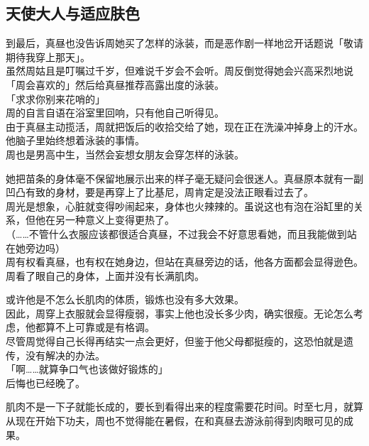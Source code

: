 \subsection{天使大人与适应肤色}

到最后，真昼也没告诉周她买了怎样的泳装，而是恶作剧一样地岔开话题说「敬请期待我穿上那天」。\\

虽然周姑且是叮嘱过千岁，但难说千岁会不会听。周反倒觉得她会兴高采烈地说「周会喜欢的」然后给真昼推荐高露出度的泳装。\\

「求求你别来花哨的」\\

周的自言自语在浴室里回响，只有他自己听得见。\\

由于真昼主动揽活，周就把饭后的收拾交给了她，现在正在洗澡冲掉身上的汗水。他脑子里始终想着泳装的事情。\\

周也是男高中生，当然会妄想女朋友会穿怎样的泳装。

她把苗条的身体毫不保留地展示出来的样子毫无疑问会很迷人。真昼原本就有一副凹凸有致的身材，要是再穿上了比基尼，周肯定是没法正眼看过去了。\\

周光是想象，心脏就变得吵闹起来，身体也火辣辣的。虽说这也有泡在浴缸里的关系，但他在另一种意义上变得更热了。\\

（……不管什么衣服应该都很适合真昼，不过我会不好意思看她，而且我能做到站在她旁边吗）\\

周有权看真昼，也有权在她身边，但站在真昼旁边的话，他各方面都会显得逊色。\\

周看了眼自己的身体，上面并没有长满肌肉。

或许他是不怎么长肌肉的体质，锻炼也没有多大效果。\\

因此，周穿上衣服就会显得瘦弱，事实上他也没长多少肉，确实很瘦。无论怎么考虑，他都算不上可靠或是有格调。\\

尽管周觉得自己长得再结实一点会更好，但鉴于他父母都挺瘦的，这恐怕就是遗传，没有解决的办法。\\

「啊……就算争口气也该做好锻炼的」\\

后悔也已经晚了。

肌肉不是一下子就能长成的，要长到看得出来的程度需要花时间。时至七月，就算从现在开始下功夫，周也不觉得能在暑假，在和真昼去游泳前得到肉眼可见的成果。\\

